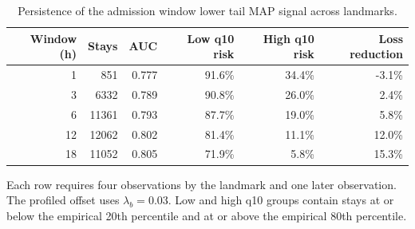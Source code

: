 \begin{table}[!htbp]
\caption{Persistence of the admission window lower tail MAP signal across landmarks.}
\label{tab:dynamic_signal_metrics}
\centering
\begin{tabular}{rrrrrr}
\hline
Window (h) & Stays & AUC & Low q10 risk & High q10 risk & Loss reduction\\
\hline
1 & 851 & 0.777 & 91.6\% & 34.4\% & -3.1\%\\
3 & 6332 & 0.789 & 90.8\% & 26.0\% & 2.4\%\\
6 & 11361 & 0.793 & 87.7\% & 19.0\% & 5.8\%\\
12 & 12062 & 0.802 & 81.4\% & 11.1\% & 12.0\%\\
18 & 11052 & 0.805 & 71.9\% & 5.8\% & 15.3\%\\
\hline
\end{tabular}
\par\smallskip
\footnotesize{Each row requires four observations by the landmark and one later observation. The profiled offset uses $\lambda_b=0.03$. Low and high q10 groups contain stays at or below the empirical 20th percentile and at or above the empirical 80th percentile.}
\end{table}
